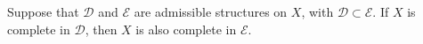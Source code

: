 Suppose that $\mathcal{D}$ and $\mathcal{E}$ are admissible structures on $X$, with $\mathcal{D} \subset \mathcal{E}$. If $X$ is complete in $\mathcal{D}$, then $X$ is also complete in $\mathcal{E}$.
